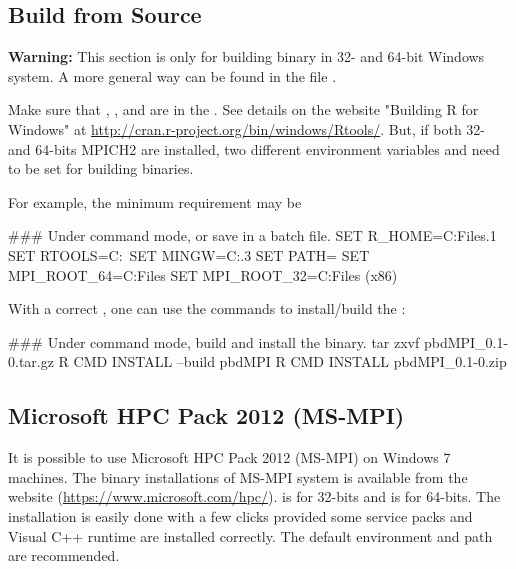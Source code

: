 \subsection[Build from Source]{Build from Source}
\label{sec:building_from_source}

{\color{red} \bf Warning:} This section is only for building binary in
32- and 64-bit Windows system. A more general way can be found in the file
.

Make sure that , , and  are in the .
See details on the website "Building R for Windows" at
\url{http://cran.r-project.org/bin/windows/Rtools/}.
But, if both 32- and 64-bits MPICH2 are installed, two different
environment variables  and 
need to be set for building binaries.

For example, the minimum requirement may be
\begin{Command}
### Under command mode, or save in a batch file.
SET R_HOME=C:\Program Files\R{}.1
SET RTOOLS=C:\Rtools\bin\
SET MINGW=C:\Rtools{}.3\bin
SET PATH=%
SET MPI_ROOT_64=C:\Program Files
SET MPI_ROOT_32=C:\Program Files (x86)
\end{Command}

With a correct , one can use the  commands
to install/build the \pkg{pbdMPI}:
\begin{Command}
### Under command mode, build and install the binary.
tar zxvf pbdMPI_0.1-0.tar.gz
R CMD INSTALL --build pbdMPI
R CMD INSTALL pbdMPI_0.1-0.zip
\end{Command}


\subsection[Microsoft HPC Pack 2012 (MS-MPI)]{Microsoft HPC Pack 2012 (MS-MPI)}
\label{sec:msmpi}

It is possible to use Microsoft HPC Pack 2012 (MS-MPI) on Windows 7 machines.
The binary installations of MS-MPI system is available
from the website (\url{https://www.microsoft.com/hpc/}).
 is for 32-bits and
 is for 64-bits.
The installation is easily done with a few clicks provided some service packs
and Visual C++ runtime are installed correctly. The
default environment and path are recommended.

